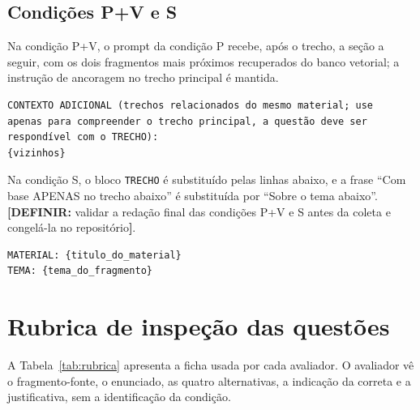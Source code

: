 \documentclass[portuguese,oneside]{tcc}
\newcommand{\definir}[1]{\textcolor{orange!75!black}{\textbf{[DEFINIR:} #1\textbf{]}}}
\begin{document}
\section{Condições P+V e S}

Na condição P+V, o prompt da condição P recebe, após o trecho, a seção a seguir, com os dois fragmentos mais próximos recuperados do banco vetorial; a instrução de ancoragem no trecho principal é mantida.

\begin{small}
\begin{verbatim}
CONTEXTO ADICIONAL (trechos relacionados do mesmo material; use
apenas para compreender o trecho principal, a questão deve ser
respondível com o TRECHO):
{vizinhos}
\end{verbatim}
\end{small}

Na condição S, o bloco \texttt{TRECHO} é substituído pelas linhas abaixo, e a frase ``Com base APENAS no trecho abaixo'' é substituída por ``Sobre o tema abaixo''. \definir{validar a redação final das condições P+V e S antes da coleta e congelá-la no repositório}.

\begin{small}
\begin{verbatim}
MATERIAL: {titulo_do_material}
TEMA: {tema_do_fragmento}
\end{verbatim}
\end{small}

\chapter{\label{ap:rubrica}Rubrica de inspeção das questões}

A Tabela~\ref{tab:rubrica} apresenta a ficha usada por cada avaliador. O avaliador vê o fragmento-fonte, o enunciado, as quatro alternativas, a indicação da correta e a justificativa, sem a identificação da condição.
\end{document}
